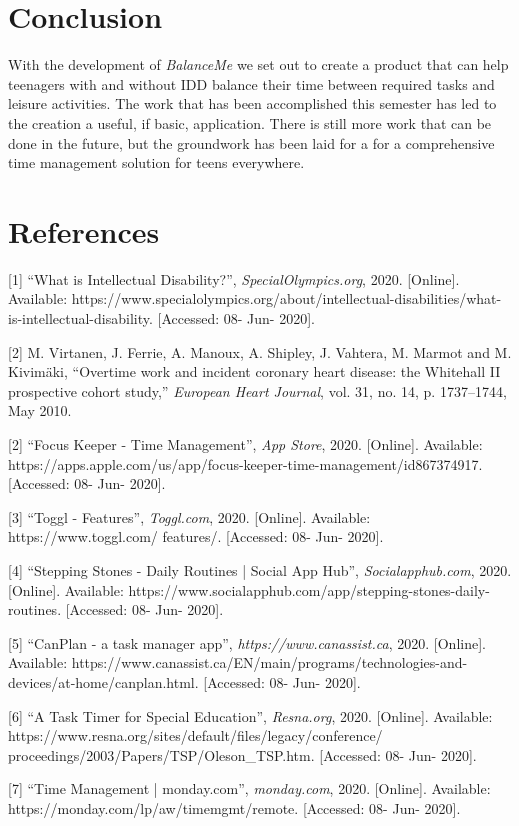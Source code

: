 \documentclass{sigchi}
\begin{document}
\section{Conclusion}

With the development of \textit{BalanceMe} we set out to create a product that
can help teenagers with and without IDD balance their time between required
tasks and leisure activities. The work that has been accomplished this semester
has led to the creation a useful, if basic, application. There is still more
work that can be done in the future, but the groundwork has been laid for a for
a comprehensive time management solution for teens everywhere.


\section{References}
[1] ``What is Intellectual Disability?'', \textit{SpecialOlympics.org}, 2020. [Online]. Available: https://www.specialolympics.org/about/intellectual-disabilities/what-is-intellectual-disability. [Accessed: 08- Jun- 2020].

[2] M. Virtanen, J. Ferrie, A. Manoux, A. Shipley, J. Vahtera, M. Marmot and M. Kivimäki, ``Overtime work and incident coronary heart disease: the Whitehall II prospective cohort study,'' \textit{European Heart Journal}, vol. 31, no. 14, p. 1737–1744, May 2010.

[2] ``Focus Keeper - Time Management'', \textit{App Store}, 2020. [Online]. Available: https://apps.apple.com/us/app/focus-keeper-time-management/id867374917. [Accessed: 08- Jun- 2020].

[3] ``Toggl - Features'', \textit{Toggl.com}, 2020. [Online]. Available: https://www.toggl.com/
features/. [Accessed: 08- Jun- 2020].

[4] ``Stepping Stones - Daily Routines | Social App Hub'', \textit{Socialapphub.com}, 2020. [Online]. Available: https://www.socialapphub.com/app/stepping-stones-daily-routines. [Accessed: 08- Jun- 2020].

[5] ``CanPlan - a task manager app'', \textit{https://www.canassist.ca}, 2020. [Online]. Available: https://www.canassist.ca/EN/main/programs/technologies-and-devices/at-home/canplan.html. [Accessed: 08- Jun- 2020].

[6] ``A Task Timer for Special Education'', \textit{Resna.org}, 2020. [Online]. Available: https://www.resna.org/sites/default/files/legacy/conference/
proceedings/2003/Papers/TSP/Oleson\_TSP.htm. [Accessed: 08- Jun- 2020].

[7] ``Time Management | monday.com'', \textit{monday.com}, 2020. [Online]. Available: https://monday.com/lp/aw/timemgmt/remote. [Accessed: 08- Jun- 2020].
\end{document}
